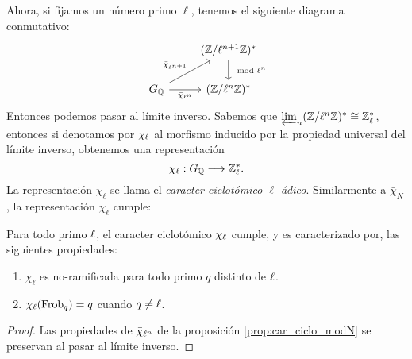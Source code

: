 \documentclass[../../tesis_maestria]{subfiles}
\begin{document}
Ahora, si fijamos un n\'umero primo $\ell$, tenemos el siguiente diagrama conmutativo:
\[
  \begin{tikzcd}
     & (\ZZ/\ell^{n+1}\ZZ)^* \arrow[d,"\mod \ell^n"]\\
     \GQ \arrow[ru,"\bar{\chi}_{\ell^{n+1}}"] \arrow[r,"\bar{\chi}_{\ell^n}"'] &
     (\ZZ/\ell^n\ZZ)^*
  \end{tikzcd}
\]
Entonces podemos pasar al l\'imite inverso. Sabemos que $\varprojlim_n (\mathbb{Z}/\ell^n\mathbb{Z})^*\cong\mathbb{Z}^*_{\ell}$, entonces si denotamos por $\chi_{\ell}$ al morfismo inducido por la propiedad universal del l\'imite inverso, obtenemos una representaci\'on
\[
  \chi_{\ell}:G_{\mathbb{Q}}\longrightarrow \mathbb{Z}^*_{\ell}.
\]
La representaci\'on $\chi_{\ell}$ se llama el \emph{caracter ciclot\'omico $\ell$-\'adico}. Similarmente a $\bar{\chi}_N$, la representaci\'on $\chi_{\ell}$ cumple:

\begin{prop}\label{prop:chiell} Para todo primo $\ell$, el caracter ciclot\'omico $\chi_{\ell}$ cumple, y es caracterizado   por, las siguientes propiedades:
\begin{enumerate}[label=\roman*)]
  \item $\chi_{\ell}$ es no-ramificada para todo primo $q$ distinto de $\ell$.
  \item $\chi_{\ell}(\mathrm{Frob}_q)=q$ cuando $q\neq\ell$.
\end{enumerate}
\end{prop}
\begin{proof}
  Las propiedades de $\bar{\chi}_{\ell^n}$ de la proposici\'on \ref{prop:car_ciclo_modN} se preservan al pasar al l\'imite inverso.
\end{proof}
\end{document}
